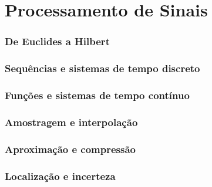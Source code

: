 \part{Processamento de Sinais}
\section{De Euclides a Hilbert}
\section{Sequências e sistemas de tempo discreto}
\section{Funções e sistemas de tempo contínuo}
\section{Amostragem e interpolação}
\section{Aproximação e compressão}
\section{Localização e incerteza}